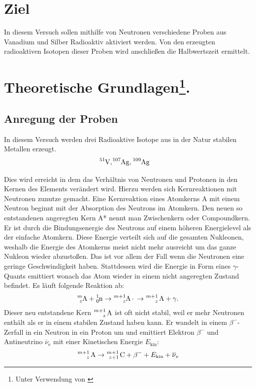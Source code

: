 \section{Ziel}
In diesem Versuch sollen mithilfe von Neutronen verschiedene Proben aus Vanadium und Silber
 Radioaktiv aktiviert werden.
Von den erzeugten radioaktiven Isotopen dieser Proben wird anschließen die Halbwertszeit ermittelt.

\section[Theoretische Grundlagen]{Theoretische Grundlagen\footnote[1]{Unter Verwendung von \cite[]{man:v702}}.}


\subsection{Anregung der Proben}

\noindent
In diesem Versuch werden drei Radioaktive Isotope aus in der Natur stabilen Metallen erzeugt.
\begin{align}
    \ce{^{51}V}, & \ce{^{107}Ag},  \ce{^{109}Ag}
\end{align}

Dies wird erreicht in dem das Verhältnis von Neutronen und Protonen in den Kernen des Elements verändert wird.
Hierzu werden sich Kernreaktionen mit Neutronen zunutze gemacht.
Eine Kernreaktion eines Atomkerns A mit einem Neutron beginnt mit der Absorption des Neutrons im Atomkern.
Den neuen so entstandenen angeregten Kern A* nennt man Zwischenkern oder Compoundkern.
Er ist durch die Bindungsenergie des Neutrons auf einem höheren Energielevel als der einfache Atomkern.
Diese Energie verteilt sich auf die gesamten Nukleonen, weshalb die Energie des Atomkerns meist nicht mehr ausreicht
um das ganze Nukleon wieder abzustoßen.
Das ist vor allem der Fall wenn die Neutronen eine geringe Geschwindigkeit haben.
Stattdessen wird die Energie in Form eines $\gamma$-Quants emittiert wonach das Atom wieder in einem nicht angeregten Zustand befindet.
Es läuft folgende Reaktion ab:
\begin{align*}
    \ce{^{m}_{z}A} + \ce{^{1}_{0}n} \rightarrow \ce{^{m+1}_{z}A*} \rightarrow \ce{^{m+1}_{z} A} + \gamma .
\end{align*}
Dieser neu entstandene Kern $\ce{^{m+1}_{z} A}$ ist oft nicht stabil, weil er mehr Neutronen enthält
als er in einem stabilen Zustand haben kann.
Er wandelt in einem $\beta^{-}$-Zerfall in ein Neutron in ein Proton um und emittiert 
Elektron $\beta^{-}$ und Antineutrino $\overline{\nu}_\text{e}$ mit einer Kinetischen Energie $E_\text{kin}$:
\begin{align*}
    \ce{^{m+1}_{z} A} \rightarrow \ce{^{m+1}_{z+1} C} + \beta^{-} + E_\text{kin} + \overline{\nu}_\text{e}
\end{align*}

